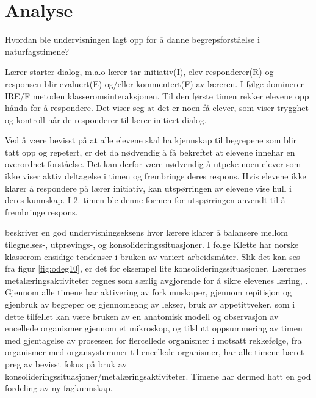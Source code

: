 \documentclass[main.tex]{subfiles}
\begin{document}
\section*{Analyse}
\label{sec:2}
Hvordan ble undervisningen lagt opp for å danne begrepsforståelse i naturfagstimene?

Lærer starter dialog, m.a.o lærer tar initiativ(I), elev responderer(R) og responsen blir
evaluert(E) og/eller kommentert(F) av læreren. I følge  dominerer IRE/F 
metoden klasseromsinteraksjonen. Til den første timen rekker elevene opp hånda for å 
respondere. Det viser seg at det er noen få elever, som viser trygghet og kontroll når 
de responderer til lærer initiert dialog. 

Ved å være bevisst på at alle elevene skal ha kjennskap til 
begrepene som blir tatt opp og repetert, er det da nødvendig å få bekreftet at elevene innehar en 
overordnet forståelse. Det kan derfor være nødvendig å utpeke noen elever som ikke viser aktiv 
deltagelse i timen og frembringe deres respons. Hvis elevene ikke klarer å respondere på lærer 
initiativ, kan utspørringen av elevene vise hull i deres kunnskap. I 2. timen ble denne formen for
utspørringen anvendt til å frembringe respons. 



 beskriver en god undervisningseksens hvor lærere klarer å balansere mellom tilegnelses-,
utprøvings-, og konsolideringssituasjoner. I følge Klette har norske klasserom ensidige tendenser i bruken av 
variert arbeidsmåter. Slik det kan ses fra figur \ref{fig:odeg10}, er det for eksempel lite konsolideringssituasjoner.
Lærernes metalæringsaktiviteter regnes som særlig avgjørende for å sikre elevenes læring, .
Gjennom alle timene har aktivering av forkunnskaper, gjennom repitisjon og gjenbruk av begreper og gjennomgang av 
lekser, bruk av appetittveker, som i dette tilfellet kan være bruken av en anatomisk modell og observasjon av
encellede organismer gjennom et mikroskop, og tilslutt oppsummering av timen med gjentagelse av prosessen
for flercellede organismer i motsatt rekkefølge, fra organismer med organsystemmer til encellede organismer, har 
alle timene bæret preg av bevisst fokus på bruk av konsolideringssituasjoner/metalæringsaktiviteter. Timene har 
dermed hatt en god fordeling av ny fagkunnskap.
\end{document}
